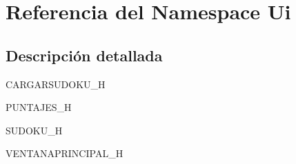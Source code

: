 \section{Referencia del Namespace Ui}
\label{namespace_ui}


\subsection{Descripción detallada}
C\-A\-R\-G\-A\-R\-S\-U\-D\-O\-K\-U\-\_\-\-H

P\-U\-N\-T\-A\-J\-E\-S\-\_\-\-H

S\-U\-D\-O\-K\-U\-\_\-\-H

V\-E\-N\-T\-A\-N\-A\-P\-R\-I\-N\-C\-I\-P\-A\-L\-\_\-\-H 